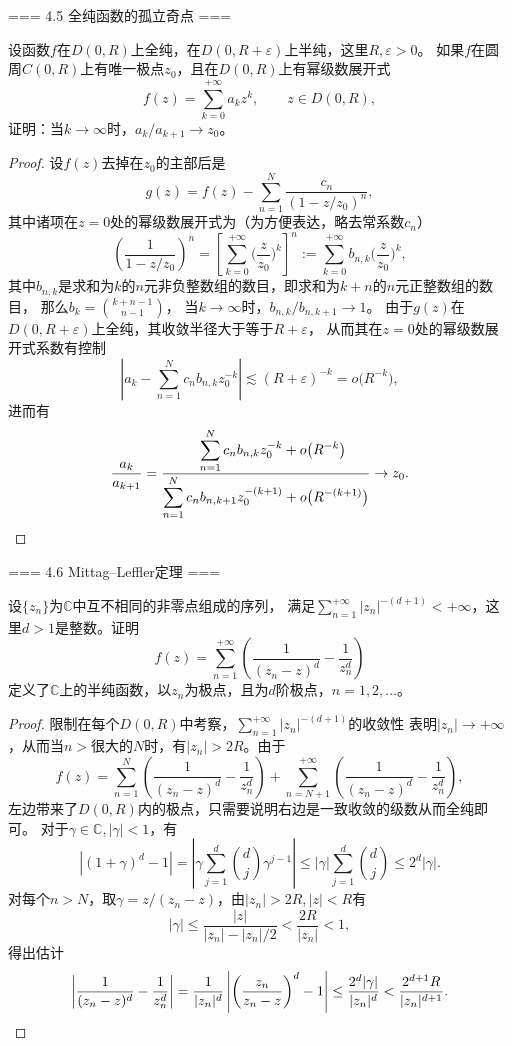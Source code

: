 === 4.5 全纯函数的孤立奇点 ===
\begin{6}
    设函数$f$在$D(0,R)$上全纯，在$D(0,R+\varepsilon)$上半纯，这里$R,\varepsilon>0$。
    如果$f$在圆周$C(0,R)$上有唯一极点$z_0$，且在$D(0,R)$上有幂级数展开式
    \[f(z)=\sum_{k=0}^{+\infty}a_kz^k, \qquad z \in D(0,R),\]
    证明：当$k\to\infty$时，$a_k/a_{k+1} \to z_0$。
\end{6}
\begin{proof}
    设$f(z)$去掉在$z_0$的主部后是
    \[g(z)=f(z)-\sum_{n=1}^{N}\frac{c_n}{(1-z/z_0)^n},\]
    其中诸项在$z=0$处的幂级数展开式为（为方便表达，略去常系数$c_n$）
    \[\left(\frac{1}{1-z/z_0}\right)^n
    =\left[\sum_{k=0}^{+\infty}\bigg(\frac{z}{z_0}\bigg)^k\right]^n
    :=\sum_{k=0}^{+\infty}b_{n,k}\bigg(\frac{z}{z_0}\bigg)^k,\]
    其中$b_{n,k}$是求和为$k$的$n$元非负整数组的数目，即求和为$k+n$的$n$元正整数组的数目，
    那么$\displaystyle b_k=\binom{k+n-1}{n-1}$，
    当$k\to\infty$时，$b_{n,k}/b_{n,k+1}\to1$。
    由于$g(z)$在$D(0,R+\varepsilon)$上全纯，其收敛半径大于等于$R+\varepsilon$，
    从而其在$z=0$处的幂级数展开式系数有控制
    \[\left|a_k-\sum_{n=1}^{N}c_nb_{n,k}z_0^{-k}\right|
    \lesssim(R+\varepsilon)^{-k}=o\big(R^{-k}\big),\]
    进而有
    \[\frac{a_k}{a_{k+1}}=\frac{\ \ \ \displaystyle\sum_{n=1}^{N}c_nb_{n,k}z_0^{-k}+o\big(R^{-k}\big)}
    {\displaystyle\sum_{n=1}^{N}c_nb_{n,k+1}z_0^{-(k+1)}+o\big(R^{-(k+1)}\big)} \to z_0.\qedhere\]
\end{proof}

=== 4.6 Mittag--Leffler定理 ===
\begin{4}
    设$\{z_n\}$为$\mathbb{C}$中互不相同的非零点组成的序列，
    满足$\sum\limits_{n=1}^{+\infty}|z_n|^{-(d+1)}<+\infty$，这里$d>1$是整数。证明
    \[f(z)=\sum_{n=1}^{+\infty}\left(\frac{1}{(z_n-z)^d}-\frac{1}{z_n^d}\right)\]
    定义了$\mathbb{C}$上的半纯函数，以$z_n$为极点，且为$d$阶极点，$n=1,2,\dots$。
\end{4}
\begin{proof}
    限制在每个$D(0,R)$中考察，$\sum\limits_{n=1}^{+\infty}|z_n|^{-(d+1)}$的收敛性
    表明$|z_n|\to+\infty$，从而当$n>$很大的$N$时，有$|z_n|>2R$。由于
    \[f(z)=\sum_{n=1}^{N}\left(\frac{1}{(z_n-z)^d}-\frac{1}{z_n^d}\right)
    +\sum_{n=N+1}^{+\infty}\left(\frac{1}{(z_n-z)^d}-\frac{1}{z_n^d}\right),\]
    左边带来了$D(0,R)$内的极点，只需要说明右边是一致收敛的级数从而全纯即可。
    对于$\gamma\in\mathbb{C},|\gamma|<1$，有
    \[|(1+\gamma)^d-1|=\left|\gamma\sum_{j=1}^{d}\binom{d}{j}\gamma^{j-1}\right|
    \le|\gamma|\sum_{j=1}^{d}\binom{d}{j}\le2^d|\gamma|.\]
    对每个$n>N$，取$\gamma=z/(z_n-z)$，由$|z_n|>2R,|z|<R$有
    \[|\gamma|\le\frac{|z|}{|z_n|-|z_n|/2}<\frac{2R}{|z_n|}<1,\]
    得出估计
    \[\left|\frac{1}{(z_n-z)^d}-\frac{1}{z_n^d}\right|
    =\frac{1}{|z_n|^d}\left|\left(\frac{z_n}{z_n-z}\right)^d-1\right|
    \le\frac{2^d|\gamma|}{|z_n|^d}<\frac{2^{d+1}R}{|z_n|^{d+1}}.\qedhere\]
\end{proof}


